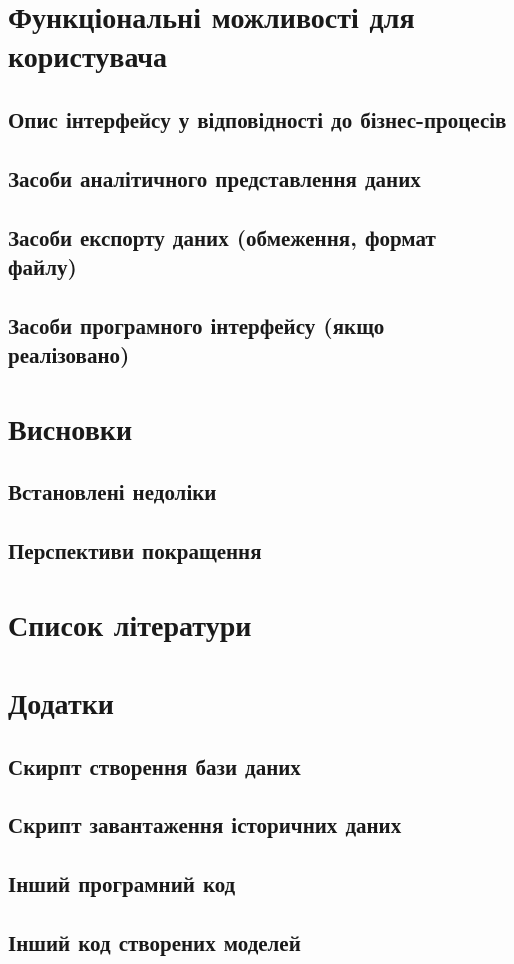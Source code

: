 \documentclass[oneside,14pt]{extarticle}
\begin{document}
\section{Функціональні можливості для користувача}
\subsection{Опис інтерфейсу у відповідності до бізнес-процесів}
\subsection{Засоби аналітичного представлення даних}
\subsection{Засоби експорту даних (обмеження, формат файлу)}
\subsection{Засоби програмного інтерфейсу (якщо реалізовано)}
\newpage

\section{Висновки}
\subsection{Встановлені недоліки}
\subsection{Перспективи покращення}
\newpage

\section{Список літератури}
\newpage

\section{Додатки}
\subsection{Скирпт створення бази даних}
\subsection{Скрипт завантаження історичних даних}
\subsection{Інший програмний код}
\subsection{Інший код створених моделей}
\newpage
\end{document}
